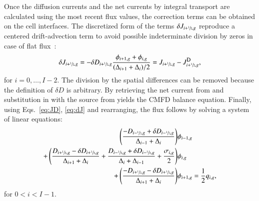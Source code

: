 Once the diffusion currents and the net currents by integral transport are calculated using the most recent flux values, the correction terms can be obtained on the cell interfaces. The discretized form of the terms $\delta J_{i+\sfrac{1}{2},g}$ reproduce a centered drift-advection term to avoid possible indeterminate division by zeros in case of flat flux~\cite{Smith-1983,Tomatis-2011}:
\begin{equation}
  \label{eq:dJ}
  \delta J_{i+\hzi,g} = -\delta D_{i+\hzi,g}
    \frac{\phi_{i+1,g} + \phi_{i,g}}{(\Delta_{i+1} + \Delta_i)/2} =
  J_{i+\hzi,g} - \jD_{i+\hzi,g},
\end{equation}
for $i = 0, \ldots, I-2$. The division by the spatial differences can be removed because the definition of $\delta D$ is arbitrary. By retrieving the net current from  and substitution in  with the source from  yields the CMFD balance equation. Finally, using Eqs.~\eqref{eq:JD}, \eqref{eq:dJ} and rearranging, the flux follows by solving a system of linear equations:
%
%
\begin{equation}
  \label{eq:CMFD-diff-rearranged}
  \begin{split}
  \left( \frac{-D_{i-\sfrac{1}{2},g} + \delta D_{i-\sfrac{1}{2},g}}{\Delta_{i-1} + \Delta_i}\right) &\phi_{i-1,g} \\
  + \left(\frac{D_{i+\sfrac{1}{2},g} - \delta D_{i+\sfrac{1}{2},g}}{\Delta_{i+1} + \Delta_i} + \frac{D_{i-\sfrac{1}{2},g} + \delta D_{i-\sfrac{1}{2},g}}{\Delta_i + \Delta_{i-1}} + \frac{\sigma_{i,g}}{2}\right) &\phi_{i,g} \\
  + \left( \frac{-D_{i+\sfrac{1}{2},g} - \delta D_{i+\sfrac{1}{2},g}}{\Delta_{i+1} + \Delta_i} \right) &\phi_{i+1,g} = \frac{1}{2}q_{i,g},
  \end{split}
\end{equation}
for $0 < i < I-1$.

